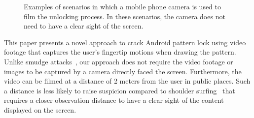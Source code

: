 \begin{figure}[!t]
        \hspace{0.15cm}
        \hspace{0.5cm}
        \caption{Examples of scenarios in which a mobile phone camera is used to film the unlocking process.
        In these scenarios, the camera does not need to have a clear sight of the screen.}
        \label{fig:fig1}
        \vspace{-5mm}
    \end{figure}

This paper presents a novel approach to crack Android pattern lock using
video footage that captures the user's fingertip motions when drawing the pattern. Unlike smudge attacks~\cite{aviv2010smudge}, our approach
does not require the video footage or images to be captured by a camera
directly faced the screen. Furthermore, the video can be filmed at a
distance of 2 meters from the user in public places. Such a distance is less likely
to raise suspicion compared to shoulder
surfing~\cite{shoulder} that requires a
closer observation distance to have a clear sight of the content displayed on the screen. %

